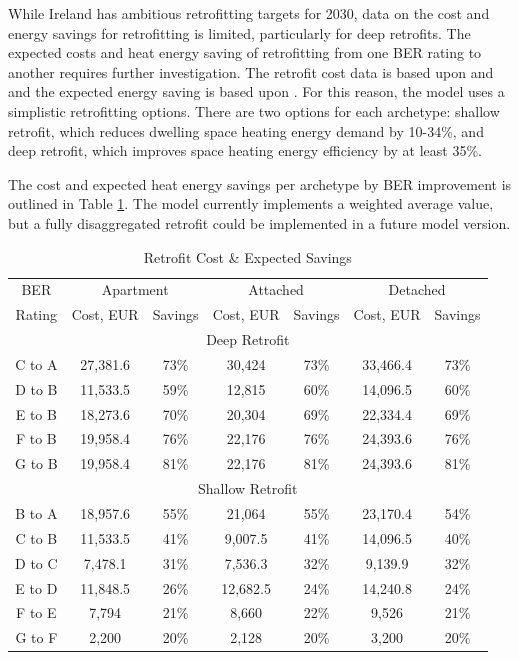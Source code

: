 \documentclass[gmd,manuscript]{copernicus}
\begin{document}
While Ireland has ambitious retrofitting targets for 2030, data on the cost and energy savings for retrofitting is limited, particularly for deep retrofits. The expected costs and heat energy saving of retrofitting from one BER rating to another requires further investigation. The retrofit cost data is based upon \citet{AECOMDECLG2013} and \citet{Ali2020} and the expected energy saving is based upon \citet{Collins2017b}. For this reason, the model uses a simplistic retrofitting options. There are two options for each archetype: shallow retrofit, which reduces dwelling space heating energy demand by 10-34\%, and deep retrofit, which improves space heating energy efficiency by at least 35\%. 

The cost and expected heat energy savings per archetype by BER improvement is outlined in Table \ref{Retrofit Expected Savings}. The model currently implements a weighted average value, but a fully disaggregated retrofit could be implemented in a future model version.

\begin{table}[ht]
 \centering
 \footnotesize
 \caption{Retrofit Cost \& Expected Savings}
 \begin{tabular}{ccccccc}
 \hline
 BER & \multicolumn{2}{c}{Apartment} & \multicolumn{2}{c}{Attached} & \multicolumn{2}{c}{Detached} \\ 
 Rating & Cost, EUR & Savings & Cost, EUR & Savings & Cost, EUR & Savings \\
 \hline
 \multicolumn{7}{c}{Deep Retrofit} \\
 \hline
 C to A & 27,381.6 & 73\% & 30,424 & 73\% & 33,466.4 & 73\% \\
 D to B	& 11,533.5 & 59\% & 12,815 & 60\% & 14,096.5 & 60\% \\
 E to B & 18,273.6 & 70\% & 20,304 & 69\% & 22,334.4 & 69\% \\
 F to B & 19,958.4 & 76\% & 22,176 & 76\% & 24,393.6 & 76\% \\
 G to B & 19,958.4 & 81\% & 22,176 & 81\% & 24,393.6 & 81\% \\
 \hline
 \multicolumn{7}{c}{Shallow Retrofit} \\[0.5ex]
 \hline
 B to A & 18,957.6 & 55\% & 21,064 & 55\% & 23,170.4 & 54\% \\
 C to B & 11,533.5 & 41\% & 9,007.5 & 41\% & 14,096.5 & 40\% \\
 D to C & 7,478.1 & 31\% & 7,536.3 & 32\% & 9,139.9 & 32\% \\
 E to D & 11,848.5 & 26\% & 12,682.5 & 24\% & 14,240.8 & 24\% \\
 F to E & 7,794 & 21\% & 8,660 & 22\% & 9,526 & 21\% \\
 G to F & 2,200 & 20\% & 2,128 & 20\% & 3,200 & 20\% \\ \hline
 \end{tabular}
 
 \label{Retrofit Expected Savings}
\end{table}
\end{document}
